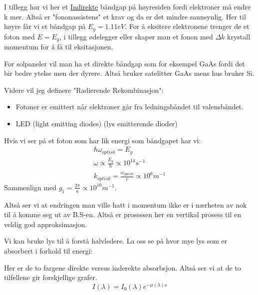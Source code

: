 \documentclass{article}
\begin{document}
I tillegg har vi her et \underline{Indirekte} båndgap på høyresiden fordi elektroner må endre k mer. Altså er "fononassistens" et krav og da er det mindre sannsynlig. Her til høyre får vi et båndgap på $E_g = 1.11 eV$. For å eksitere elektronene trenger de et foton med $E = E_g$, i tillegg ødelegger eller skaper man et fonon med $\Delta k$ krystall momentum for å få til eksitasjonen.


For solpaneler vil man ha et direkte båndgap som for eksempel GaAs fordi det bir bedre ytelse men der dyrere. Altså bruker satelitter GaAs mens hus bruker Si.

Videre vil jeg definere "Radierende Rekombinasjon":
\begin{itemize}
  \item Fotoner er emittert når elektroner går fra ledningsbåndet til valensbåndet.
  \item LED (light emitting diodes) (lys emitterende dioder)
\end{itemize}

Hvis vi ser på et foton som har lik energi som båndgapet har vi:
\begin{align*}
  \hbar \omega_{optisk} = E_g \\
  \omega \propto \frac{E_g}{\hbar} \propto 10^{14} s^{-1} \\
  k_{optisk} = \frac{\omega_{optisk}}{c} \propto 10^6 m^{-1}
\end{align*}
Sammenlign med $g_1 = \frac{2 \pi}{a} \propto 10^{10} m^{-1}$.

Altså ser vi at endringen man ville hatt i momentum ikke er i nærheten av nok til å komme seg ut av B.S-en. Altså er prosessen her en vertikal prosess til en veldig god approksimasjon. 

Vi kan bruke lys til å forstå halvledere. La oss se på hvor mye lys som er absorbert i forhold til energi:


Her er de to fargene direkte versus inderekte absorbsjon. Altså ser vi at de to tilfellene gir forskjellige grafer.
\begin{equation*}
  I(\lambda) = I_0(\lambda) e^{-\mu (\lambda) s}
\end{equation*}
\end{document}
